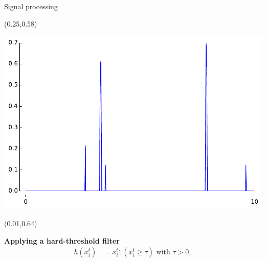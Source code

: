 \documentclass[final]{beamer}
\newenvironment{shaded2}{%
  \def\FrameCommand{\fboxsep=\FrameSep \colorbox{blue!20}}%
  \MakeFramed {\FrameRestore}}%
 {\endMakeFramed}
\begin{document}
\begin{frame}{}
\begin{textblock}{0.485}
\begin{block}{Signal processing \phantom{p}}
\begin{textblock}{0.485}(0.25,0.58)
\begin{minipage}{0.48\linewidth}
\begin{shaded2}
\begin{center}

\includegraphics[width=0.85\linewidth]{images/threshold_curve.pdf}
\end{center}

\end{shaded2}
\end{minipage}
\end{textblock}

\begin{textblock}{0.485}(0.01,0.64)
\begin{minipage}{0.48\linewidth}
\begin{shaded2}
\vspace{7pt}
{\color{lightblue} \textbf{Applying a hard-threshold filter}}
\vspace{-5pt}
\begin{align*}
h(x^{t}_i) &= x^{t}_i \mathbb{1}(x^{t}_i \geq \tau) \text{ with } \tau > 0,
\end{align*}
\vspace{8pt}
\end{shaded2}
\end{minipage}
\end{textblock}



\end{block}
\end{textblock}
\end{frame}
\end{document}
